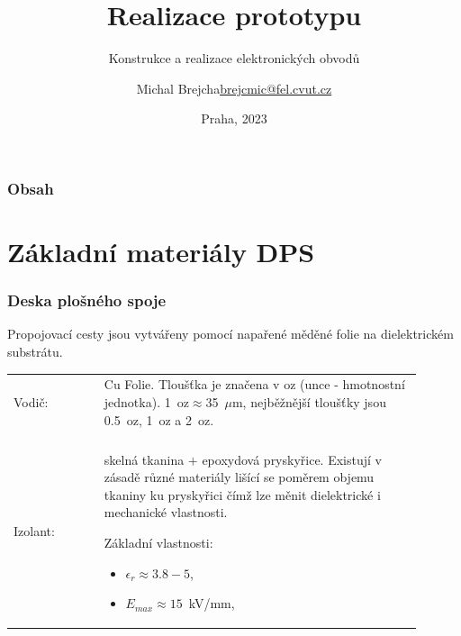 \documentclass{beamer}
\title[Realizace prototypu]{Realizace prototypu}
\subtitle[KEO] {Konstrukce a realizace elektronických obvodů}
\author[Brejcha]{\texorpdfstring{Michal Brejcha\newline\url{brejcmic@fel.cvut.cz}}{Michal Brejcha}}
\institute[ČVUT]{ČVUT v Praze, FEL}
\date[Praha, 2023]{Praha, 2023}
\begin{document}
\frame{\titlepage}

\begin{frame}
\frametitle{Obsah} 
\tableofcontents
\end{frame}


\section{\texorpdfstring{Základní materiály DPS}{Základní materiály DPS}}
\begin{frame}
	\frametitle{Deska plošného spoje}
	
	Propojovací cesty jsou vytvářeny pomocí napařené měděné folie na dielektrickém substrátu. 

	\begin{center}
		\begin{tabular}{p{0.2\linewidth} p{0.7\linewidth}}
		Vodič: & Cu Folie. Tloušťka je značena v oz (unce - hmotnostní jednotka). 1~oz$\approx$35~$\mu$m, nejběžnější tloušťky jsou 0.5~oz, 1~oz a 2~oz.\\ \\
		Izolant: & skelná tkanina $+$ epoxydová pryskyřice. Existují v zásadě různé materiály lišící se poměrem objemu tkaniny ku pryskyřici čímž lze měnit dielektrické i mechanické vlastnosti.
		
		Základní vlastnosti:
		
		\begin{itemize}
			\item $\epsilon_r\approx 3.8 - 5$,
			\item $E_{max}\approx 15$~kV/mm,
		\end{itemize}
		\end{tabular}
	\end{center}
\end{frame}
\end{document}
